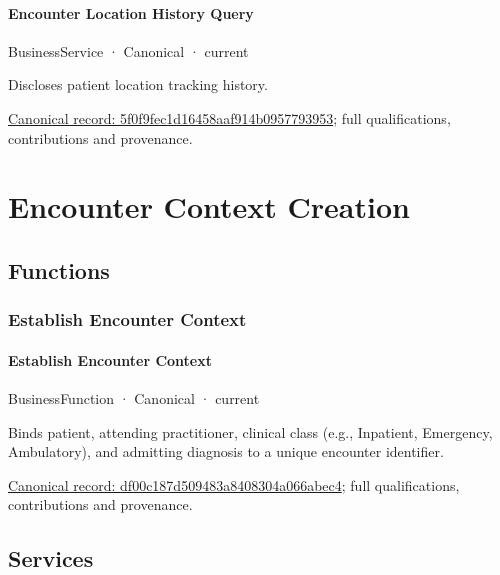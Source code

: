 \paragraph{Encounter Location History Query}

\label{element:5f0f9fec1d16458aaf914b0957793953}
{\small BusinessService · Canonical · current}\par

Discloses patient location tracking history.


{\footnotesize \href{../../../../continuum/business/business-service/5f0f9fec1d16458aaf914b0957793953.md}{Canonical record: 5f0f9fec1d16458aaf914b0957793953}; full qualifications, contributions and provenance.}\par
\section{Encounter Context Creation}

\subsection{Functions}

\subsubsection{Establish Encounter Context}

\paragraph{Establish Encounter Context}

\label{element:df00c187d509483a8408304a066abec4}
{\small BusinessFunction · Canonical · current}\par

Binds patient, attending practitioner, clinical class (e.g., Inpatient, Emergency, Ambulatory), and admitting diagnosis to a unique encounter identifier.


{\footnotesize \href{../../../../continuum/business/business-function/df00c187d509483a8408304a066abec4.md}{Canonical record: df00c187d509483a8408304a066abec4}; full qualifications, contributions and provenance.}\par
\subsection{Services}

